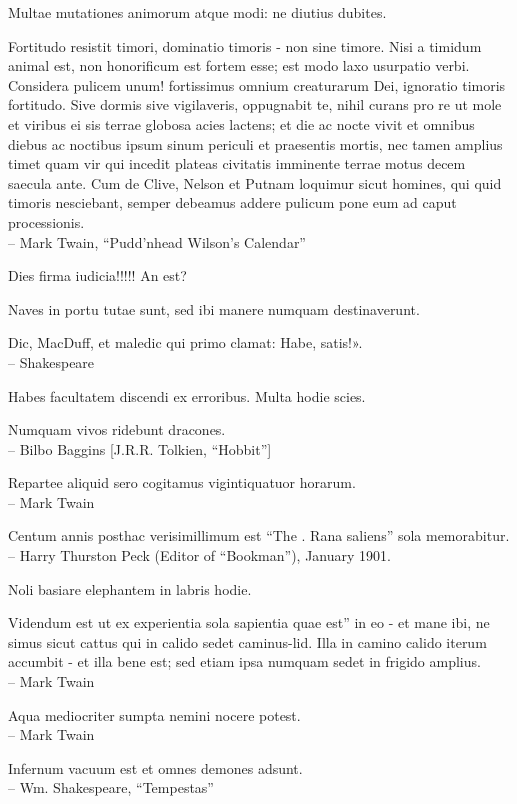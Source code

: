\documentclass[titlepage,12pt]{memoir}
\begin{document}
Multae mutationes animorum atque modi: ne diutius dubites.

Fortitudo resistit timori, dominatio timoris - non sine timore. Nisi a
timidum animal est, non honorificum est fortem esse; est modo
laxo usurpatio verbi. Considera pulicem unum!
fortissimus omnium creaturarum Dei, ignoratio timoris fortitudo.
Sive dormis sive vigilaveris, oppugnabit te, nihil curans pro re
ut mole et viribus ei sis terrae globosa acies
lactens; et die ac nocte vivit et omnibus diebus ac noctibus
ipsum sinum periculi et praesentis mortis, nec tamen amplius
timet quam vir qui incedit plateas civitatis imminente
terrae motus decem saecula ante. Cum de Clive, Nelson et Putnam loquimur
sicut homines, qui quid timoris nesciebant, semper debeamus addere pulicum
pone eum ad caput processionis.
\\-- Mark Twain, “Pudd’nhead Wilson’s Calendar”

Dies firma iudicia!!!!! An est?

Naves in portu tutae sunt, sed ibi manere numquam destinaverunt.

Dic, MacDuff, et maledic qui primo clamat: Habe, satis!».
\\-- Shakespeare

Habes facultatem discendi ex erroribus. Multa hodie scies.

Numquam vivos ridebunt dracones.
\\-- Bilbo Baggins [J.R.R. Tolkien, “Hobbit”]

Repartee aliquid sero cogitamus vigintiquatuor horarum.
\\-- Mark Twain

Centum annis posthac verisimillimum est “The .
Rana saliens” sola memorabitur.
\\-- Harry Thurston Peck (Editor of “Bookman”), January 1901.

Noli basiare elephantem in labris hodie.

Videndum est ut ex experientia sola sapientia quae est”
in eo - et mane ibi, ne simus sicut cattus qui in calido sedet
caminus-lid. Illa in camino calido iterum accumbit - et illa
bene est; sed etiam ipsa numquam sedet in frigido amplius.
\\-- Mark Twain

Aqua mediocriter sumpta nemini nocere potest.
\\-- Mark Twain

Infernum vacuum est et omnes demones adsunt.
\\-- Wm. Shakespeare, “Tempestas”
\end{document}
